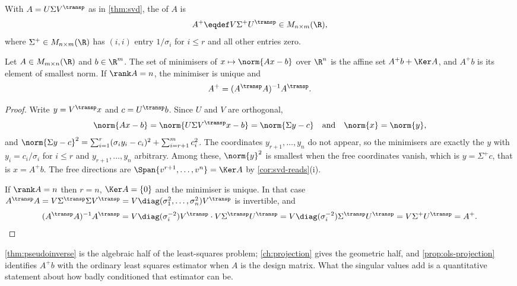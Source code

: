 \begin{definition}\label{def:pseudoinverse}
	With $A=U\Sigma V^{\transp}$ as in \autoref{thm:svd}, the
	 of $A$ is
	\[
		A^{+}\eqdef V\Sigma^{+}U^{\transp}\in M_{n\times m}(\R),
	\]
	where $\Sigma^{+}\in M_{n\times m}(\R)$ has $(i,i)$ entry $1/\sigma_i$ for
	$i\leq r$ and all other entries zero.
\end{definition}

\begin{theorem}\label{thm:pseudoinverse}
	Let $A\in M_{m\times n}(\R)$ and $b\in\R^m$. The set of minimisers of
	$x\mapsto\norm{Ax-b}$ over $\R^n$ is the affine set $A^{+}b+\Ker A$, and
	$A^{+}b$ is its element of smallest norm. If $\rank A=n$, the minimiser is
	unique and
	\[
		A^{+}=(A^{\transp}A)^{-1}A^{\transp}.
	\]
\end{theorem}

\begin{proof}
	Write $y=V^{\transp}x$ and $c=U^{\transp}b$. Since $U$ and $V$ are orthogonal,
	\[
		\norm{Ax-b}=\norm{U\Sigma V^{\transp}x-b}=\norm{\Sigma y-c}
		\quad\text{and}\quad\norm{x}=\norm{y},
	\]
	and $\norm{\Sigma y-c}^2=\sum_{i=1}^{r}(\sigma_iy_i-c_i)^2
		+\sum_{i=r+1}^{m}c_i^2$. The coordinates $y_{r+1},\dots,y_n$ do not appear,
	so the minimisers are exactly the $y$ with $y_i=c_i/\sigma_i$ for $i\leq r$ and
	$y_{r+1},\dots,y_n$ arbitrary. Among these, $\norm{y}^2$ is smallest when the
	free coordinates vanish, which is $y=\Sigma^{+}c$, that is $x=A^{+}b$. The free
	directions are $\Span\{v^{r+1},\dots,v^n\}=\Ker A$ by
	\autoref{cor:svd-reads}(i).

	If $\rank A=n$ then $r=n$, $\Ker A=\{0\}$ and the minimiser is unique. In that
	case $A^{\transp}A=V\Sigma^{\transp}\Sigma V^{\transp}
		=V\diag(\sigma_1^2,\dots,\sigma_n^2)V^{\transp}$ is invertible, and
	\[
		(A^{\transp}A)^{-1}A^{\transp}
		=V\diag(\sigma_i^{-2})V^{\transp}\cdot V\Sigma^{\transp}U^{\transp}
		=V\diag(\sigma_i^{-2})\Sigma^{\transp}U^{\transp}
		=V\Sigma^{+}U^{\transp}=A^{+}. \qedhere
	\]
\end{proof}

\autoref{thm:pseudoinverse} is the algebraic half of the least-squares problem;
\autoref{ch:projection} gives the geometric half, and \autoref{prop:ols-projection} identifies
$A^{+}b$ with the ordinary least squares estimator when $A$ is the design matrix.
What the singular values add is a quantitative statement about how badly
conditioned that estimator can be.

